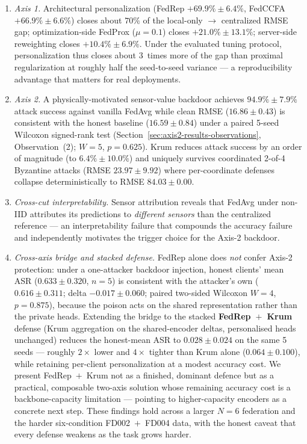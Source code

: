 \documentclass[a4paper,fleqn,doubleblind]{cas-sc}
\begin{document}
\begin{enumerate}
    \item \emph{Axis 1.} Architectural personalization (FedRep
    $+69.9\% \pm 6.4\%$, FedCCFA $+66.9\% \pm 6.6\%$) closes about
    $70\%$ of the local-only $\to$ centralized RMSE gap;
    optimization-side FedProx ($\mu = 0.1$) closes
    $+21.0\% \pm 13.1\%$; server-side reweighting closes
    $+10.4\% \pm 6.9\%$. Under the evaluated tuning protocol,
    personalization thus closes about $3$~times more of the gap
    than proximal regularization at roughly half the seed-to-seed
    variance --- a reproducibility advantage that matters for
    real deployments.

    \item \emph{Axis 2.} A physically-motivated sensor-value
    backdoor achieves $94.9\% \pm 7.9\%$ attack success against
    vanilla FedAvg while clean RMSE ($16.86 \pm 0.43$) is
    consistent with the honest baseline ($16.59 \pm 0.84$) under a
    paired 5-seed Wilcoxon signed-rank test
    (Section~\ref{sec:axis2-results-observations}, Observation~(2);
    $W = 5$, $p = 0.625$). Krum reduces attack success by an order
    of magnitude (to $6.4\% \pm 10.0\%$) and uniquely survives
    coordinated 2-of-4 Byzantine attacks
    (RMSE $23.97 \pm 9.92$) where per-coordinate defenses collapse
    deterministically to RMSE $84.03 \pm 0.00$.

    \item \emph{Cross-cut interpretability.} Sensor attribution
    reveals that FedAvg under non-IID attributes its predictions to
    \emph{different sensors} than the centralized reference --- an
    interpretability failure that compounds the accuracy failure
    and independently motivates the trigger choice for the Axis-2
    backdoor.

    \item \emph{Cross-axis bridge and stacked defense.} FedRep
    alone does \emph{not} confer Axis-2 protection: under a
    one-attacker backdoor injection, honest clients' mean ASR
    ($0.633 \pm 0.320$, $n = 5$) is consistent with the attacker's
    own ($0.616 \pm 0.311$; delta $-0.017 \pm 0.060$; paired
    two-sided Wilcoxon $W = 4$, $p = 0.875$), because the poison
    acts on the shared representation rather than the private
    heads. Extending the bridge to the stacked \textbf{FedRep~$+$~Krum}
    defense (Krum aggregation on the shared-encoder deltas,
    personalised heads unchanged) reduces the honest-mean ASR to
    $\mathbf{0.028 \pm 0.024}$ on the same 5 seeds --- roughly
    $2\times$ lower and $4\times$ tighter than Krum alone
    ($0.064 \pm 0.100$), while retaining per-client personalization
    at a modest accuracy cost. We present FedRep~$+$~Krum not as a
    finished, dominant defence but as a practical, composable
    two-axis solution whose remaining accuracy cost is a
    backbone-capacity limitation --- pointing to higher-capacity
    encoders as a concrete next step. These findings hold across a
    larger $N = 6$ federation and the harder six-condition
    FD002~$+$~FD004 data, with the honest caveat that every defense
    weakens as the task grows harder.
\end{enumerate}
\end{document}
